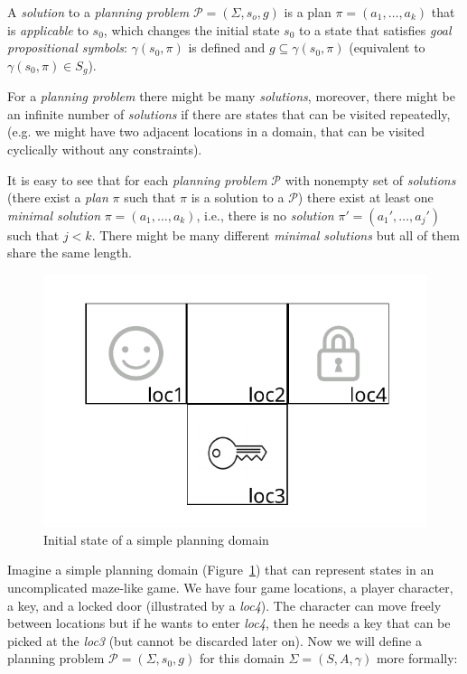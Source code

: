 \begin{defn}\label{def01:4}
    A \emph{solution} to a \emph{planning problem} $\mathcal{P}=(\Sigma,s_o,g)$ is a plan $\pi=(a_1,\dots,a_k)$ that is \emph{applicable} to $s_0$, which changes the initial state $s_0$ to a state that satisfies \emph{goal propositional symbols}: $\gamma(s_0,\pi)$ is defined and $g \subseteq \gamma(s_0,\pi)$ (equivalent to $\gamma(s_0,\pi) \in S_g$).
\end{defn}

\noindent
For a \emph{planning problem} there might be many \emph{solutions}, moreover, there might be an infinite number of \emph{solutions} if there are states that can be visited repeatedly, (e.g. we might have two adjacent locations in a domain, that can be visited cyclically without any constraints).

\medbreak\noindent
It is easy to see that for each \emph{planning problem} $\mathcal{P}$ with nonempty set of \emph{solutions} (there exist a \emph{plan} $\pi$ such that $\pi$ is a solution to a $\mathcal{P}$) there exist at least one \emph{minimal solution} $\pi=(a_1,\dots,a_k)$, i.e., there is no \emph{solution} $\pi'=(a_1',\dots,a_j')$ such that $j < k$. There might be many different \emph{minimal solutions} but all of them share the same length.


\begin{example}\label{ex01:1}
    \begin{figure}
        \centering
        \includegraphics{img/output_mares_key1.pdf}
        \caption{Initial state of a simple planning domain}
        \label{fig01:1}
    \end{figure}
    
    Imagine a simple planning domain (Figure~\ref{fig01:1}) that can represent states in an uncomplicated maze-like game. We have four game locations, a player character, a key, and a locked door (illustrated by a \emph{loc4}). The character can move freely between locations but if he wants to enter \emph{loc4}, then he needs a key that can be picked at the \emph{loc3} (but cannot be discarded later on). Now we will define a planning problem $\mathcal{P}=(\Sigma,s_0,g)$ for this domain $\Sigma=(S,A,\gamma)$ more formally:
    
\end{example}

